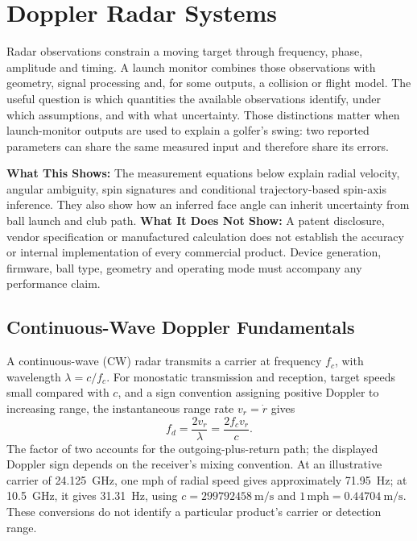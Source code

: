 \chapter{Doppler Radar Systems}
\label{ch:radar}
\nocite{us12186643,flightscopex3,homeperformancelab,manzellaforum}

Radar observations constrain a moving target through frequency, phase, amplitude and timing.
A launch monitor combines those observations with geometry, signal processing and, for some outputs, a collision or flight model.
The useful question is which quantities the available observations identify, under which assumptions, and with what uncertainty.
Those distinctions matter when launch-monitor outputs are used to explain a golfer's swing: two reported parameters can share the same measured input and therefore share its errors.

\begin{keypoint}
\textbf{What This Shows:} The measurement equations below explain radial velocity, angular ambiguity, spin signatures and conditional trajectory-based spin-axis inference.
They also show how an inferred face angle can inherit uncertainty from ball launch and club path.
\textbf{What It Does Not Show:} A patent disclosure, vendor specification or manufactured calculation does not establish the accuracy or internal implementation of every commercial product.
Device generation, firmware, ball type, geometry and operating mode must accompany any performance claim.
\end{keypoint}

\section{Continuous-Wave Doppler Fundamentals}
\label{sec:cwdoppler}

A continuous-wave (CW) radar transmits a carrier at frequency $f_c$, with wavelength $\lambda=c/f_c$.
For monostatic transmission and reception, target speeds small compared with $c$, and a sign convention assigning positive Doppler to increasing range, the instantaneous range rate $v_r=\dot r$ gives
\begin{equation}
\label{eq:doppler}
f_d = \frac{2v_r}{\lambda}=\frac{2f_cv_r}{c}.
\end{equation}
The factor of two accounts for the outgoing-plus-return path; the displayed Doppler sign depends on the receiver's mixing convention.
At an illustrative carrier of \SI{24.125}{\giga\hertz}, one mph of radial speed gives approximately \SI{71.95}{\hertz}; at \SI{10.5}{\giga\hertz}, it gives \SI{31.31}{\hertz}, using $c=\SI{299792458}{\meter\per\second}$ and $1\,\mathrm{mph}=\SI{0.44704}{\meter\per\second}$.
These conversions do not identify a particular product's carrier or detection range.

